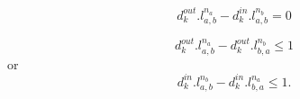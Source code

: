     
    	\begin{equation}%
	d_k^{out}.l_{a,b}^{n_a} - d_k^{in}.l_{a,b}^{n_b} = 0
		\label{eqs8}
	\end{equation}


	\begin{equation}%
	d_k^{out}.l_{a,b}^{n_a} - d_k^{out}.l_{b,a}^{n_b} \leq 1
		\label{eqs9}
	\end{equation}
	\; \; \; \; \; \; \; \; \; \; \; \; \; \; \; \; \; \; \; \;\; \; \; \; \; \; \; \; \; \; \; \;\; \; \;\;\; \;or
		\begin{equation*}%
	d_k^{in}.l_{a,b}^{n_b} - d_k^{in}.l_{b,a}^{n_a} \leq 1.
		\label{eqs10}
	\end{equation*}
    	

